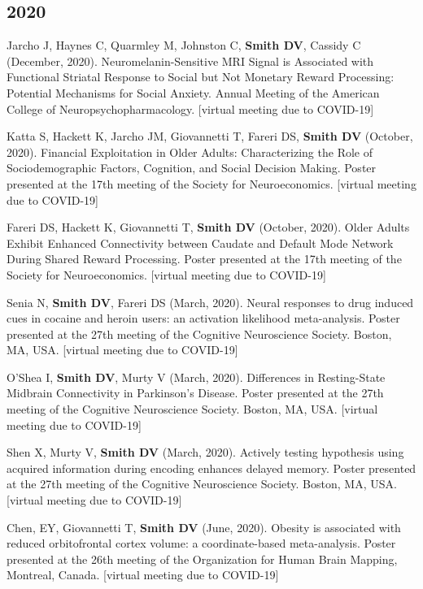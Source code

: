 \documentclass[11pt, letterpaper]{article}
\begin{document}
\subsection*{2020}
\begin{hangparas}{.5in}{1}

Jarcho J, Haynes C, Quarmley M, Johnston C, \textbf{Smith DV}, Cassidy C (December, 2020). Neuromelanin-Sensitive MRI Signal is Associated with Functional Striatal Response to Social but Not Monetary Reward Processing: Potential Mechanisms for Social Anxiety. Annual Meeting of the American College of Neuropsychopharmacology. [virtual meeting due to COVID-19]

Katta S, Hackett K, Jarcho JM, Giovannetti T, Fareri DS, \textbf{Smith DV} (October, 2020). Financial Exploitation in Older Adults: Characterizing the Role of Sociodemographic Factors, Cognition, and Social Decision Making. Poster presented at the 17th meeting of the Society for Neuroeconomics. [virtual meeting due to COVID-19]

Fareri DS, Hackett K, Giovannetti T, \textbf{Smith DV} (October, 2020). Older Adults Exhibit Enhanced Connectivity between Caudate and Default Mode Network During Shared Reward Processing. Poster presented at the 17th meeting of the Society for Neuroeconomics. [virtual meeting due to COVID-19]

Senia N, \textbf{Smith DV}, Fareri DS (March, 2020). Neural responses to drug induced cues in cocaine and heroin users: an activation likelihood meta-analysis. Poster presented at the 27th meeting of the Cognitive Neuroscience Society. Boston, MA, USA. [virtual meeting due to COVID-19]

O'Shea I, \textbf{Smith DV}, Murty V (March, 2020). Differences in Resting-State Midbrain Connectivity in Parkinson’s Disease. Poster presented at the 27th meeting of the Cognitive Neuroscience Society. Boston, MA, USA. [virtual meeting due to COVID-19]

Shen X, Murty V, \textbf{Smith DV} (March, 2020). Actively testing hypothesis using acquired information during encoding enhances delayed memory. Poster presented at the 27th meeting of the Cognitive Neuroscience Society. Boston, MA, USA. [virtual meeting due to COVID-19]

Chen, EY, Giovannetti T, \textbf{Smith DV} (June, 2020). Obesity is associated with reduced orbitofrontal cortex volume: a coordinate-based meta-analysis. Poster presented at the 26th meeting of the Organization for Human Brain Mapping, Montreal, Canada. [virtual meeting due to COVID-19] \\

\end{hangparas}
\end{document}
